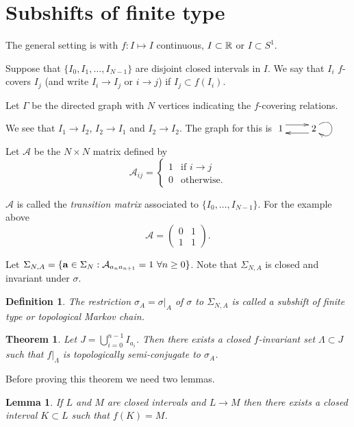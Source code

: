 \documentclass{notes}
\newcommand{\cA}{\mathcal{A}}
\theoremstyle{plain}
\newtheorem{theorem}[proposition]{Theorem}
\newtheorem{definition}[proposition]{Definition}
\newtheorem{lemma}[proposition]{Lemma}
\begin{document}
\section{Subshifts of finite type}

The general setting is with $f \colon I \mapsto I$ continuous,
$I \subset \mathbb{R}$ or $I \subset S^1$.

Suppose that $\{I_0,I_1,\dots,I_{N-1}\}$ are disjoint closed intervals in
$I$.  We say that $I_i$ $f$-covers $I_j$ (and write $I_i \to I_j$
or $i \to j$) if $I_j \subset f(I_i)$.

Let $\Gamma$ be the directed graph with $N$ vertices indicating the
$f$-covering relations.

\vspace{1.5in}

We see that $I_1 \to I_2$, $I_2 \to I_1$ and $I_2 \to I_2$.  The graph
for this is $\xymatrix{1\ar@<1ex>[r] & \ar@<1ex>[l] 2 \ar @(ur,dr)}$

Let $\cA$ be the $N \times N$ matrix defined by
\[
\cA_{ij} = \begin{cases}
1 & \text{if } i \to j \\
0 & \text{otherwise.}
\end{cases}
\]

$\cA$ is called the \emph{transition matrix} associated to
$\{ I_0, \dots,I_{N-1}\}$.  For the example above
\[
\cA = \begin{pmatrix} 0 & 1 \\ 1 & 1 \end{pmatrix}.
\]

Let $\Sigma_{N,A} = \{ \vect{a} \in \Sigma_N : \cA_{a_n a_{n+1}} = 1
\ \forall n \ge 0 \}$.  Note that $\Sigma_{N,A}$ is closed and invariant
under $\sigma$.

\begin{definition}
The restriction $\sigma_A = \left.\sigma\right|_A$ of $\sigma$ to
$\Sigma_{N,A}$ is called a \emph{subshift of finite type} or
\emph{topological Markov chain}.
\end{definition}

\begin{theorem}\label{thm:tcMk}
Let $J = \bigcup_{i=0}^{n-1} I_{a_i}$.  Then there exists a
closed $f$-invariant set $\Lambda \subset J$ such that $\left.f\right|_\Lambda$
is topologically semi-conjugate to $\sigma_A$.
\end{theorem}

Before proving this theorem we need two lemmas.

\begin{lemma}\label{lem:lmk}
If $L$ and $M$ are closed intervals and $L \to M$ then there exists a
closed interval $K \subset L$ such that $f(K) = M$.
\end{lemma}
\end{document}
